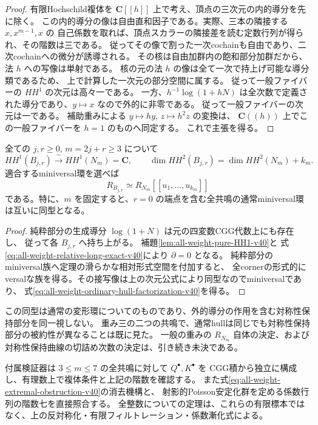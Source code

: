 \begin{proof}
有限Hochschild複体を $\mathbf C[[h]]$ 上で考え、頂点の三次元の内的導分を先に除く。
この内的導分の像は自由直和因子である。実際、三本の隣接する $x,x^{m-1},x$ の
自己係数を取れば、頂点スカラーの隣接差を読む定数行列が得られ、その階数は三である。
従ってその像で割った一次cochainも自由であり、二次cochainへの微分が誘導される。
その核は自由加群内の飽和部分加群だから、法 $h$ への写像は単射である。
核の元の法 $h$ の像は全て一次で持上げ可能な導分類であるため、
上で計算した一次元の部分空間に属する。
従って一般ファイバーの $HH^1$ の次元は高々一である。
一方、$h^{-1}\log(1+hN)$ は全次数で定義された導分であり、$y\mapsto x$ なので外的に非零である。
従って一般ファイバーの次元は一である。
補助重みによる $y\mapsto h y$, $z\mapsto h^2z$ の変換は、
$\mathbf C((h))$ 上でこの一般ファイバーを $h=1$ のものへ同定する。
これで主張を得る。
\end{proof}

\begin{corollary}[同じ重みの全共鳴は同じ通常変形環を持つ]
\label{cor:all-weight-ordinary-hulls-v40}
全ての $j,r\ge0$, $m=2j+r\ge3$ について
\[
 HH^1(B_{j,r})\xrightarrow{\ \sim\ }HH^1(N_m)=\mathbf C,
 \qquad
 \dim HH^2(B_{j,r})=\dim HH^2(N_m)+k_m.
\]
適合するminiversal環を選べば
\begin{equation}
 R_{B_{j,r}}\simeq R_{N_m}[[u_1,\ldots,u_{k_m}]]
 \label{eq:all-weight-ordinary-hull-factorization-v40}
\end{equation}
である。特に、$m$ を固定すると、$r=0$ の端点を含む全共鳴の通常miniversal環は互いに同型となる。
\end{corollary}

\begin{proof}
純粋部分の生成導分 $\log(1+N)$ は元の四変数CGG代数上にも存在し、
従って各 $B_{j,r}$ へ持ち上がる。
補題\ref{lem:all-weight-pure-HH1-v40}と
式\eqref{eq:all-weight-relative-long-exact-v40}により $\partial=0$ となる。
純粋部分のminiversal族へ定理の滑らかな相対形式空間を付加すると、
全cornerの形式的にversalな族を得る。その接写像は上の次元公式により同型なのでminiversalであり、
式\eqref{eq:all-weight-ordinary-hull-factorization-v40}を得る。
\end{proof}

この同型は通常の変形環についてのものであり、外的導分の作用を含む対称性保持部分を同一視しない。
重み三の二つの共鳴で、通常hullは同じでも対称性保持部分の被約性が異なることは既に見た。
一般の重みの $R_{N_m}$ 自体の決定、および対称性保持曲線の切詰め次数の決定は、引き続き未決である。

付属検証器は $3\le m\le7$ の全共鳴に対して $Q^\bullet,K^\bullet$ を
CGG積から独立に構成し、有理数上で複体条件と上記の階数を確認する。
また式\eqref{eq:all-weight-extremal-obstruction-v40}の消去機構と、
射影的Poisson安定化群を定める係数行列の階数七を直接照合する。
全整数についての定理は、これらの有限標本ではなく、上の反対称化・有限フィルトレーション・係数漸化式による。

